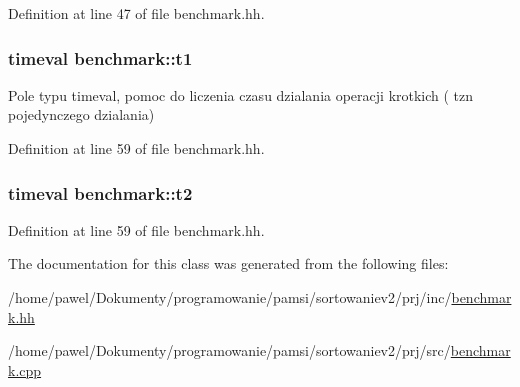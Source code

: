 Definition at line 47 of file benchmark.\-hh.

\hypertarget{classbenchmark_a7789217b36df3b3ae427ceaaa2694d0b}{
\subsubsection[{t1}]{\setlength{\rightskip}{0pt plus 5cm}timeval benchmark\-::t1\hspace{0.3cm}{\ttfamily [private]}}}\label{classbenchmark_a7789217b36df3b3ae427ceaaa2694d0b}


Pole typu timeval, pomoc do liczenia czasu dzialania operacji krotkich ( tzn pojedynczego dzialania) 



Definition at line 59 of file benchmark.\-hh.

\hypertarget{classbenchmark_aea9f22e585c0c5826329e48a97a99803}{
\subsubsection[{t2}]{\setlength{\rightskip}{0pt plus 5cm}timeval benchmark\-::t2\hspace{0.3cm}{\ttfamily [private]}}}\label{classbenchmark_aea9f22e585c0c5826329e48a97a99803}


Definition at line 59 of file benchmark.\-hh.



The documentation for this class was generated from the following files\-:\begin{DoxyCompactItemize}
\item 
/home/pawel/\-Dokumenty/programowanie/pamsi/sortowaniev2/prj/inc/\hyperlink{benchmark_8hh}{benchmark.\-hh}\item 
/home/pawel/\-Dokumenty/programowanie/pamsi/sortowaniev2/prj/src/\hyperlink{benchmark_8cpp}{benchmark.\-cpp}\end{DoxyCompactItemize}
